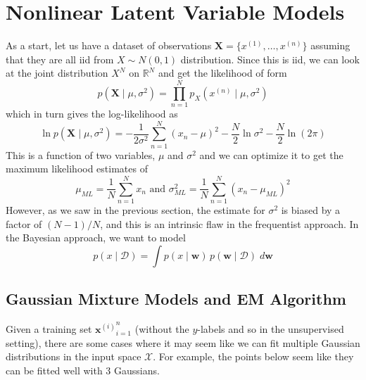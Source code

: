 \section{Nonlinear Latent Variable Models}

    As a start, let us have a dataset of observations $\mathbf{X} = \{x^{(1)}, \ldots, x^{(n)}\}$ assuming that they are all iid from $X \sim N(0, 1)$ distribution. Since this is iid, we can look at the joint distribution $X^N$ on $\mathbb{R}^N$ and get the likelihood of form
    \begin{equation}
      p(\mathbf{X} \mid \mu, \sigma^2) = \prod_{n=1}^N p_X (x^{(n)} \mid \mu, \sigma^2)
    \end{equation}
    which in turn gives the log-likelihood as 
    \begin{equation}
      \ln p(\mathbf{X} \mid \mu, \sigma^2) = -\frac{1}{2 \sigma^2} \sum_{n=1}^N (x_n - \mu)^2 - \frac{N}{2} \ln \sigma^2 - \frac{N}{2} \ln(2 \pi)
    \end{equation}
    This is a function of two variables, $\mu$ and $\sigma^2$ and we can optimize it to get the maximum likelihood estimates of 
    \begin{equation}
      \mu_{ML} = \frac{1}{N} \sum_{n=1}^N x_n \text{ and } \sigma^2_{ML} = \frac{1}{N} \sum_{n=1}^N (x_n - \mu_{ML})^2
    \end{equation}
    However, as we saw in the previous section, the estimate for $\sigma^2$ is biased by a factor of $(N-1)/N$, and this is an intrinsic flaw in the frequentist approach. In the Bayesian approach, we want to model
    \begin{equation}
      p(x \mid \mathcal{D}) = \int p(x \mid \mathbf{w}) \, p(\mathbf{w} \mid \mathcal{D}) \; d\mathbf{w}
    \end{equation}

  \subsection{Gaussian Mixture Models and EM Algorithm}

      Given a training set ${\mathbf{x}^{(i)}}_{i=1}^n$ (without the $y$-labels and so in the unsupervised setting), there are some cases where it may seem like we can fit multiple Gaussian distributions in the input space $\mathcal{X}$. For example, the points below seem like they can be fitted well with 3 Gaussians.

